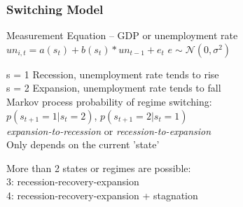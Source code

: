 \documentclass{beamer}
\begin{document}
\begin{frame}
	\frametitle{Switching Model}
	
Measurement Equation -- GDP or unemployment rate
\\
\medskip
\hspace{.25in} 
 $ un_{i,t} =  a(s_{t}) + b(s_{t}) * un_{t-1} + e_{t}   $  
\hspace{.25in}  
 $  e \sim \mathcal{N}(0,\sigma^2)  $
 	
\medskip
\hspace{.25in} 
s = 1 Recession, unemployment rate tends to rise \\
\hspace{.25in} 
s = 2 Expansion, unemployment rate tends to fall \\
  
\medskip
Markov process probability of regime switching:
\\
\hspace{.25in} 
    $ p(s_{t+1}=1|s_{t}=2)$,
    \hspace{.10in}
    $ p(s_{t+1}=2|s_{t}=1) $
\\

\textit{expansion-to-recession} or  \textit{recession-to-expansion} 
\\
Only depends on the current 'state' 

\medskip
\medskip
More than 2 states or regimes are possible: \\
\hspace{.25in} 
  3: recession-recovery-expansion 
\\
\hspace{.25in} 
  4: recession-recovery-expansion + stagnation 
\\
       
\end{frame}
\end{document}
